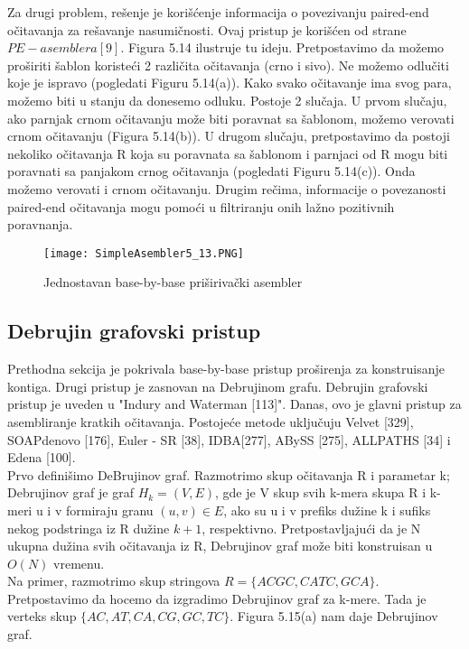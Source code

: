 \documentclass{article}
\begin{document}
Za drugi problem, rešenje je korišćenje informacija o povezivanju paired-end očitavanja za rešavanje nasumičnosti. Ovaj pristup je korišćen od strane $PE-asemblera [9]$. Figura 5.14 ilustruje tu ideju. Pretpostavimo da možemo proširiti šablon koristeći 2 različita očitavanja (crno i sivo). Ne možemo odlučiti koje je ispravo (pogledati Figuru 5.14(a)). Kako svako očitavanje ima svog para, možemo biti u stanju da donesemo odluku. Postoje 2 slučaja. U prvom slučaju, ako parnjak crnom očitavanju može biti poravnat sa šablonom, možemo verovati crnom očitavanju (Figura 5.14(b)). U drugom slučaju, pretpostavimo  da postoji nekoliko očitavanja R koja su poravnata sa šablonom i parnjaci od R mogu biti poravnati sa panjakom crnog očitavanja (pogledati Figuru 5.14(c)). Onda možemo verovati i crnom očitavanju. Drugim rečima, informacije o povezanosti paired-end očitavanja mogu pomoći u  filtriranju onih lažno pozitivnih poravnanja.\\

\begin{figure}[h]
\centering
\texttt{[image: SimpleAsembler5\_13.PNG]}
\caption{Jednostavan base-by-base priširivački asembler}
\end{figure}

\subsection{Debrujin grafovski pristup}

Prethodna sekcija je pokrivala base-by-base pristup proširenja za konstruisanje kontiga. Drugi pristup je zasnovan  na Debrujinom grafu. Debrujin grafovski pristup je uveden u "Indury and Waterman [113]". Danas, ovo je glavni pristup za asembliranje kratkih očitavanja. Postojeće metode uključuju Velvet [329], SOAPdenovo [176], Euler - SR [38], IDBA[277], ABySS [275], ALLPATHS [34] i Edena [100]. \\

Prvo definišimo DeBrujinov graf. Razmotrimo skup očitavanja R i parametar k; Debrujinov graf je graf $H_k = (V, E)$, gde je V skup svih k-mera skupa R i k-meri u i v formiraju granu $(u, v) \in E$, ako su u i v prefiks dužine k i sufiks nekog podstringa iz R dužine $k + 1$, respektivno. Pretpostavljajući da je N ukupna dužina svih očitavanja iz R, Debrujinov graf može biti konstruisan u $O(N)$ vremenu.\\

Na primer, razmotrimo skup stringova $R = \{ACGC, CATC, GCA\}$. Pretpostavimo da hocemo da izgradimo Debrujinov graf za k-mere. Tada je verteks skup $\{AC, AT, CA, CG, GC, TC\}$. Figura 5.15(a) nam daje Debrujinov graf. \\
\end{document}
